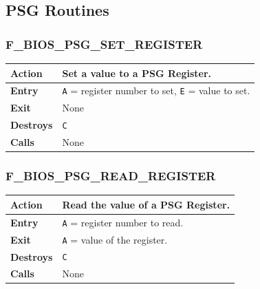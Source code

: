 \documentclass[a4paper,11pt]{article}
\begin{document}
    \subsection{PSG Routines}

        \subsubsection{F\_BIOS\_PSG\_SET\_REGISTER}
        \label{func:fbiospsgsetregister}
        \begin{tabular}{l p{9cm}}
            \hline\textbf{Action}
            & Set a value to a PSG Register. \\
            \hline\textbf{Entry} & \texttt{A} = register number to set, \texttt{E}
            = value to set.\\
            \hline\textbf{Exit} & None\\
            \hline\textbf{Destroys} & \texttt{C} \\
            \hline\textbf{Calls} & None\\
            \hline
        \end{tabular}

        \subsubsection{F\_BIOS\_PSG\_READ\_REGISTER}
        \label{func:fbiospsgreadregister}
        \begin{tabular}{l p{9cm}}
            \hline\textbf{Action}
            & Read the value of a PSG Register. \\
            \hline\textbf{Entry} & \texttt{A} = register number to read.\\
            \hline\textbf{Exit} & \texttt{A} = value of the register.\\
            \hline\textbf{Destroys} & \texttt{C} \\
            \hline\textbf{Calls} & None\\
            \hline
        \end{tabular}
\end{document}
